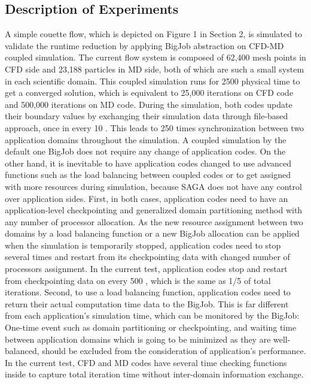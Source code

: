 \documentclass[conference,final]{IEEEtran}
\begin{document}
\subsection{Description of Experiments}
A simple couette flow, which is depicted on Figure 1 in Section 2, is simulated to validate the runtime reduction by applying BigJob abstraction on CFD-MD coupled simulation. The current flow system is composed of 62,400 mesh points in CFD side and 23,188 particles in MD side, both of which are such a small system in each scientific domain. This coupled simulation runs for 2500 \tau physical time to get a converged solution, which is equivalent to 25,000 iterations on CFD code and 500,000 iterations on MD code. During the simulation, both codes update their boundary values by exchanging their simulation data through file-based approach, once in every 10 \tau. This leads to 250 times synchronization between two application domains throughout the simulation.
A coupled simulation by the default one BigJob does not require any change of application codes. On the other hand, it is inevitable to have application codes changed to use advanced functions such as the load balancing between coupled codes or to get assigned with more resources during simulation, because SAGA does not have any control over application sides. First, in both cases, application codes need to have an application-level checkpointing and generalized domain partitioning method with any number of processor allocation. As the new resource assignment between two domains by a load balancing function or a new BigJob allocation can be applied when the simulation is temporarily stopped, application codes need to stop several times and restart from its checkpointing data with changed number of processors assignment. In the current test, application codes stop and restart from checkpointing data on every 500 \tau, which is the same as 1/5 of total iterations. Second, to use a load balancing function, application codes need to return their actual computation time data to the BigJob. This is far different from each application's simulation time, which can be monitored by the BigJob: One-time event such as domain partitioning or checkpointing, and waiting time between application domains which is going to be minimized as they are well-balanced, should be excluded from the consideration of application's performance. In the current test, CFD and MD codes have several time checking functions inside to capture total iteration time without inter-domain information exchange.
\end{document}
